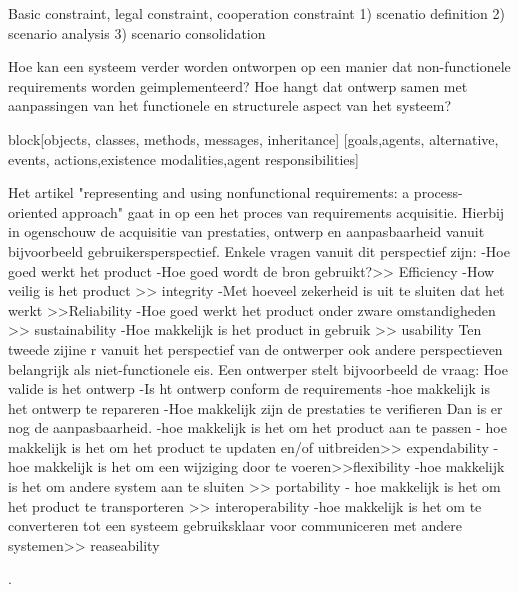Basic constraint, legal constraint, cooperation constraint
1) scenatio  definition
2) scenario analysis
3) scenario consolidation


Hoe kan een systeem verder worden ontworpen op een manier dat non-functionele requirements worden geimplementeerd?
Hoe hangt dat ontwerp samen met aanpassingen van het functionele en structurele aspect van het systeem?

block[objects, classes, methods, messages, inheritance]
[goals,agents, alternative, events, actions,existence modalities,agent responsibilities]


Het artikel "representing and using nonfunctional requirements: a process-oriented approach" \cite{myloloupos1992representingReqs} gaat in op een het proces van requirements acquisitie. Hierbij in ogenschouw de acquisitie van prestaties, ontwerp en aanpasbaarheid vanuit bijvoorbeeld gebruikersperspectief. Enkele vragen vanuit dit perspectief zijn:
-Hoe goed werkt het product
-Hoe goed wordt de bron gebruikt?>> Efficiency
-How veilig is het product >> integrity
-Met hoeveel zekerheid is uit  te sluiten dat het werkt >>Reliability
-Hoe goed werkt het product onder zware omstandigheden >> sustainability
-Hoe makkelijk is het product in gebruik >> usability
 Ten tweede zijine r vanuit het perspectief van de ontwerper ook andere perspectieven  belangrijk als niet-functionele eis. Een ontwerper stelt bijvoorbeeld de vraag:
Hoe valide is het ontwerp
-Is ht ontwerp conform de requirements
-hoe makkelijk is het ontwerp te repareren
-Hoe makkelijk zijn de prestaties te verifieren
Dan is er nog de aanpasbaarheid.
-hoe makkelijk is het om het product aan te passen
- hoe makkelijk is het om het product te updaten en/of uitbreiden>> expendability
- hoe makkelijk is het om een wijziging door te voeren>>flexibility
-hoe makkelijk is het om andere system aan te sluiten >> portability
- hoe makkelijk is het om het product te transporteren >> interoperability
-hoe makkelijk is het om te converteren tot een systeem gebruiksklaar voor communiceren met andere systemen>> reaseability \cite{myloloupos1992representingReqs}


\cite{jonkerTreurKlush200informativeAgents}
\cite{boehmBoseLeeRequirementsNegotiations}
\cite{muHungJinLiu2013inconsistencyReqs}
\cite{hunterNuseibeh1996manageSpecs}
\cite{myloloupos1992representingReqs}
\cite{zavePamela4darkCorners}
\cite{zavePAmela1997regEngineering}.


